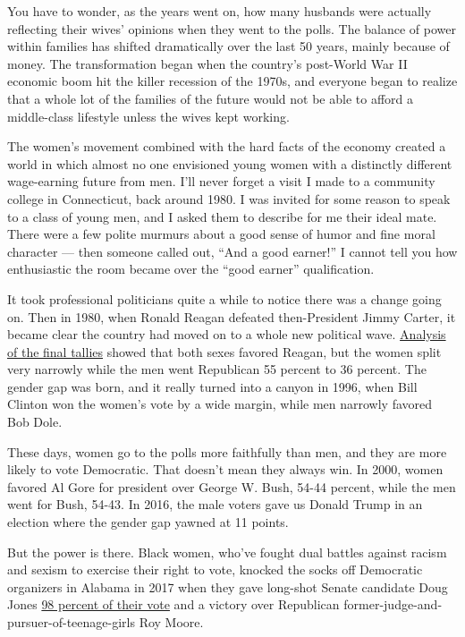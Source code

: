 You have to wonder, as the years went on, how many husbands were
actually reflecting their wives' opinions when they went to the polls.
The balance of power within families has shifted dramatically over the
last 50 years, mainly because of money. The transformation began when
the country's post-World War II economic boom hit the killer recession
of the 1970s, and everyone began to realize that a whole lot of the
families of the future would not be able to afford a middle-class
lifestyle unless the wives kept working.

The women's movement combined with the hard facts of the economy created
a world in which almost no one envisioned young women with a distinctly
different wage-earning future from men. I'll never forget a visit I made
to a community college in Connecticut, back around 1980. I was invited
for some reason to speak to a class of young men, and I asked them to
describe for me their ideal mate. There were a few polite murmurs about
a good sense of humor and fine moral character --- then someone called
out, ``And a good earner!'' I cannot tell you how enthusiastic the room
became over the ``good earner'' qualification.

It took professional politicians quite a while to notice there was a
change going on. Then in 1980, when Ronald Reagan defeated
then-President Jimmy Carter, it became clear the country had moved on to
a whole new political wave.
\href{http://cawp.rutgers.edu/sites/default/files/resources/ggpresvote.pdf}{Analysis
of the final tallies} showed that both sexes favored Reagan, but the
women split very narrowly while the men went Republican 55 percent to 36
percent. The gender gap was born, and it really turned into a canyon in
1996, when Bill Clinton won the women's vote by a wide margin, while men
narrowly favored Bob Dole.

These days, women go to the polls more faithfully than men, and they are
more likely to vote Democratic. That doesn't mean they always win. In
2000, women favored Al Gore for president over George W. Bush, 54-44
percent, while the men went for Bush, 54-43. In 2016, the male voters
gave us Donald Trump in an election where the gender gap yawned at 11
points.

But the power is there. Black women, who've fought dual battles against
racism and sexism to exercise their right to vote, knocked the socks off
Democratic organizers in Alabama in 2017 when they gave long-shot Senate
candidate Doug Jones
\href{https://thehill.com/homenews/campaign/364665-exit-polls-98-percent-of-black-women-voted-for-jones}{98
percent of their vote} and a victory over Republican
former-judge-and-pursuer-of-teenage-girls Roy Moore.

